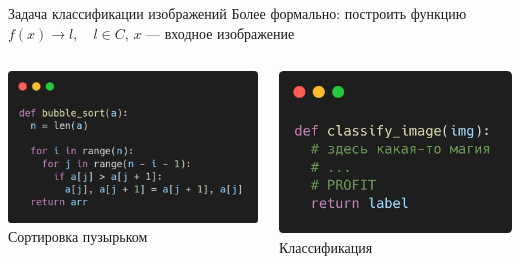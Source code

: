 \documentclass[aspectratio=169, professionalfonts]{beamer}
\begin{document}
\begin{frame}{Задача классификации изображений}
    Более формально: построить функцию
    \( f(x) \rightarrow l, \quad l \in C \), \(x\) --- входное изображение
    \vfill
    \begin{columns}
        \begin{column}{.49\linewidth}
            \centering
            \includegraphics[width=\linewidth]{figures/fig8-bubble-sort.jpg}
            Сортировка пузырьком
        \end{column}
        \begin{column}{.43\linewidth}
            \centering
            \includegraphics[width=\linewidth]{figures/fig9-clf-function.jpg}
            Классификация
        \end{column}
    \end{columns}
\end{frame}
\end{document}
